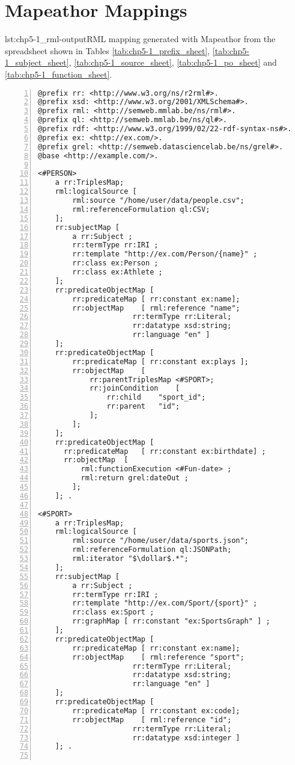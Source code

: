 \section{Mapeathor Mappings}
\label{sec:appendix-mapeathor}

\begin{captionedlisting}{lst:chp5-1_rml-output}{RML mapping generated with Mapeathor from the spreadsheet shown in Tables \ref{tab:chp5-1_prefix_sheet}, \ref{tab:chp5-1_subject_sheet}, \ref{tab:chp5-1_source_sheet}, \ref{tab:chp5-1_po_sheet} and \ref{tab:chp5-1_function_sheet}. }
\centering
{\begin{lstlisting}[numbers=left,basicstyle=\ttfamily\small,columns=flexible]
@prefix rr: <http://www.w3.org/ns/r2rml#>.
@prefix xsd: <http://www.w3.org/2001/XMLSchema#>.
@prefix rml: <http://semweb.mmlab.be/ns/rml#>.
@prefix ql: <http://semweb.mmlab.be/ns/ql#>.
@prefix rdf: <http://www.w3.org/1999/02/22-rdf-syntax-ns#>.
@prefix ex: <http://ex.com/>.
@prefix grel: <http://semweb.datasciencelab.be/ns/grel#>.
@base <http://example.com/>.

<#PERSON>
    a rr:TriplesMap;
    rml:logicalSource [
    	rml:source "/home/user/data/people.csv";
    	rml:referenceFormulation ql:CSV;
    ];
    rr:subjectMap [
    	a rr:Subject ;
    	rr:termType rr:IRI ;
    	rr:template "http://ex.com/Person/{name}" ;
    	rr:class ex:Person ;
    	rr:class ex:Athlete ;
    ];
    rr:predicateObjectMap [
    	rr:predicateMap	[ rr:constant ex:name];
    	rr:objectMap	[ rml:reference "name"; 
                      rr:termType rr:Literal;  
                      rr:datatype xsd:string;  
                      rr:language "en" ]
    ];
    rr:predicateObjectMap [
    	rr:predicateMap	[ rr:constant ex:plays ];
    	rr:objectMap	[
    		rr:parentTriplesMap	<#SPORT>;
    		rr:joinCondition	[
    			rr:child	"sport_id";
    			rr:parent	"id";
    		];
    	];
    ];
    rr:predicateObjectMap [
      rr:predicateMap	[ rr:constant ex:birthdate] ;
      rr:objectMap	[
    	  rml:functionExecution <#Fun-date> ;
    	  rml:return grel:dateOut ;
    	];
    ]; .

<#SPORT>
    a rr:TriplesMap;
    rml:logicalSource [
    	rml:source "/home/user/data/sports.json";
    	rml:referenceFormulation ql:JSONPath;
        rml:iterator "$\dollar$.*";
    ];
    rr:subjectMap [
    	a rr:Subject ;
    	rr:termType rr:IRI ;
    	rr:template "http://ex.com/Sport/{sport}" ;
    	rr:class ex:Sport ;
    	rr:graphMap [ rr:constant "ex:SportsGraph" ] ;
    ];
    rr:predicateObjectMap [
    	rr:predicateMap	[ rr:constant ex:name];
    	rr:objectMap	[ rml:reference "sport";  
                      rr:termType rr:Literal;  
                      rr:datatype xsd:string;  
                      rr:language "en" ]
    ];
    rr:predicateObjectMap [
    	rr:predicateMap	[ rr:constant ex:code];
    	rr:objectMap	[ rml:reference "id";  
                      rr:termType rr:Literal;  
                      rr:datatype xsd:integer ]
    ]; .


\end{lstlisting}}
\end{captionedlisting}
